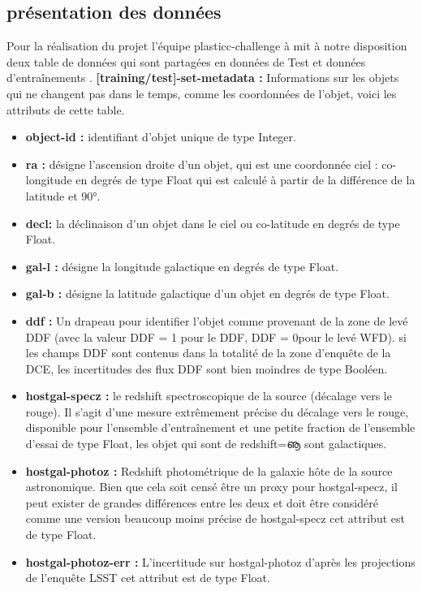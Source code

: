 \subsection{présentation des données}
Pour la réalisation du projet l’équipe plasticc-challenge à mit à notre disposition deux table de données qui sont partagées en données de Test et données d’entraînements .
\newline
\newline
\textbf{[training/test]-set-metadata :} Informations sur les objets qui ne changent pas dans le temps, comme les coordonnées de l’objet, voici les attributs de cette table.
\begin{itemize}
    \item \textbf{object-id :} identifiant d’objet unique de type Integer.
    \item \textbf{ra :} désigne l’ascension droite d’un objet, qui est une coordonnée ciel : co-longitude en degrés de type Float qui est calculé à partir de la différence de la latitude et 90°.
    \item \textbf{ decl:} la déclinaison d’un objet dans le ciel ou co-latitude en degrés de type Float.
    \item \textbf{ gal-l :} désigne la longitude galactique en degrés de type Float.
    \item \textbf{gal-b : }désigne la latitude galactique d’un objet en degrés de type Float.
    \item \textbf{ ddf :} Un drapeau pour identifier l’objet comme provenant de la zone de levé DDF (avec la valeur DDF = 1 pour le DDF, DDF = 0pour le levé WFD). si les champs DDF sont contenus dans la totalité de la zone d’enquête de la DCE, les incertitudes des flux DDF sont bien moindres de type Booléen.
    \item \textbf{ hostgal-specz : }le redshift spectroscopique de la source (décalage vers le rouge). Il s’agit d’une mesure extrêmement précise du décalage vers le rouge, disponible pour l’ensemble d’entraînement et une petite fraction de l’ensemble d’essai de type Float, les objet qui sont de redshift=ൡ sont galactiques.
    \item \textbf{hostgal-photoz :} Redshift photométrique de la galaxie hôte de la source astronomique. Bien que cela soit censé être un proxy pour hostgal-specz, il peut exister de grandes différences entre les deux et doit être considéré comme une version beaucoup moins précise de hostgal-specz cet attribut est de type Float.
    \item \textbf{hostgal-photoz-err :} L’incertitude sur hostgal-photoz d’après les projections de l’enquête LSST cet attribut est de type Float.

\end{itemize}
